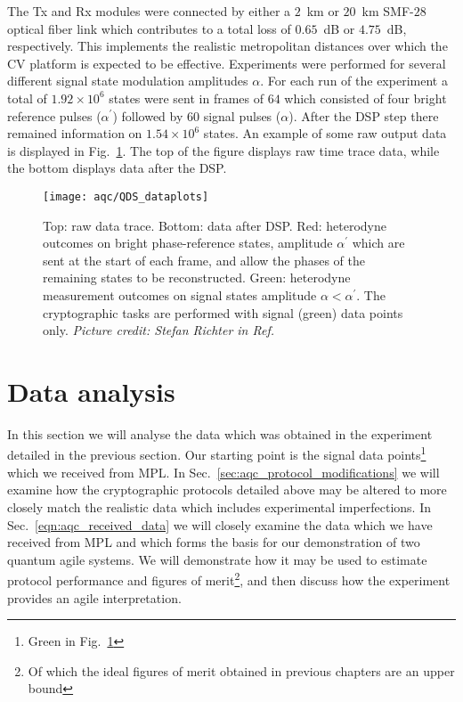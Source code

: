 The Tx and Rx modules were connected by either a $2$~km or $20$~km SMF-$28$ optical fiber link which contributes to a total loss of $0.65$~dB or $4.75$~dB, respectively. This implements the realistic metropolitan distances over which the CV platform is expected to be effective. Experiments were performed for several different signal state modulation amplitudes $\alpha$. For each run of the experiment a total of $1.92\times 10^6$ states were sent in frames of $64$ which consisted of four bright reference pulses ($\alpha^\prime$) followed by $60$ signal pulses ($\alpha$). After the DSP step there remained information on $1.54 \times 10^6$ states. An example of some raw output data is displayed in Fig.~\ref{fig:aqc_experimental_trace}. The top of the figure displays raw time trace data, while the bottom displays data after the DSP.


\begin{figure}[htp]
\captionsetup{width=0.8\linewidth}
\centering
\texttt{[image: aqc/QDS\_dataplots]}
\caption{\label{fig:aqc_experimental_trace} Top: raw data trace. Bottom: data after DSP. Red: heterodyne outcomes on bright phase-reference states, amplitude $\alpha^\prime$ which are sent at the start of each frame, and allow the phases of the remaining states to be reconstructed. Green: heterodyne measurement outcomes on signal states amplitude $\alpha < \alpha^\prime$. The cryptographic tasks are performed with signal (green) data points only. \emph{Picture credit: Stefan Richter in Ref.~\cite{Richter2020}}
}
\end{figure}

\clearpage
\section{Data analysis}
In this section we will analyse the data which was obtained in the experiment detailed in the previous section. Our starting point is the signal data points\footnote{Green in Fig.~\ref{fig:aqc_experimental_trace}} which we received from MPL. In Sec.~\ref{sec:aqc_protocol_modifications} we will examine how the cryptographic protocols detailed above may be altered to more closely match the realistic data which includes experimental imperfections. %
In Sec.~\ref{eqn:aqc_received_data} we will closely examine the data which we have received from MPL and which forms the basis for our demonstration of two quantum agile systems. We will demonstrate how it may be used to estimate protocol performance and figures of merit\footnote{Of which the ideal figures of merit obtained in previous chapters are an upper bound}, and then discuss how the experiment provides an agile interpretation.

